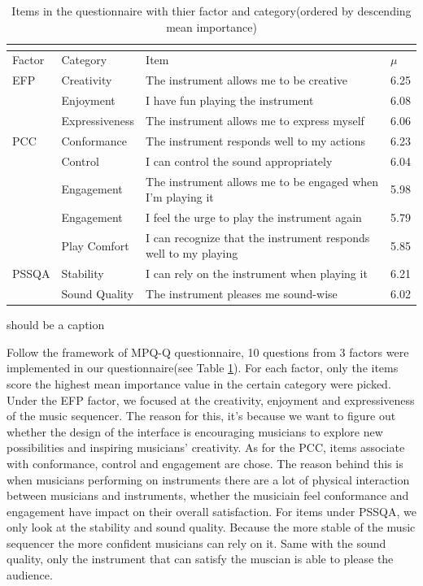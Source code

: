 \begin{table}
  \caption{Items in the questionnaire with thier factor and category(ordered by descending mean importance)}
  \label{tab: questionnaire}

  \begin{tabular}{ |p{1.2cm}|p{2.5cm}|p{9.2cm}|p{0.6cm}|}
   \multicolumn{4}{l}{} \\
   \hline
   Factor & Category  & Item  & $\mu$ \\
   \hline
   EFP & Creativity & The instrument allows me to be creative & 6.25\\
   & Enjoyment &  I have fun playing the instrument & 6.08\\
   & Expressiveness & The instrument allows me to express myself & 6.06\\
   \hline
   PCC & Conformance & The instrument responds well to my actions & 6.23\\
   & Control & I can control the sound appropriately & 6.04\\
   & Engagement & The instrument allows me to be engaged when I'm playing it & 5.98\\
   & Engagement & I feel the urge to play the instrument again & 5.79\\
   & Play Comfort & I can recognize that the instrument responds well to my playing & 5.85\\
   \hline
   PSSQA & Stability & I can rely on the instrument when playing it & 6.21\\
   & Sound Quality & The instrument pleases me sound-wise & 6.02\\
   \hline
  \end{tabular}
  \small should be a caption
\end{table}

\bigskip

Follow the framework of MPQ-Q questionnaire, 10 questions from 3 factors were implemented in our questionnaire(see Table \ref{tab: questionnaire}). For each factor, only the items score the highest mean importance value in the certain category were picked. Under the EFP factor, we focused at the creativity, enjoyment and expressiveness of the music sequencer. The reason for this, it's because we want to figure out whether the design of the interface is encouraging musicians to explore new possibilities and inspiring musicians' creativity. As for the PCC, items associate with conformance, control and engagement are chose. The reason behind this is when musicians performing on instruments there are a lot of physical interaction between musicians and instruments, whether the musiciain feel conformance and engagement have impact on their overall satisfaction. For items under PSSQA, we only look at the stability and sound quality. Because the more stable of the music sequencer the more confident musicians can rely on it. Same with the sound quality, only the instrument that can satisfy the muscian is able to please the audience.

